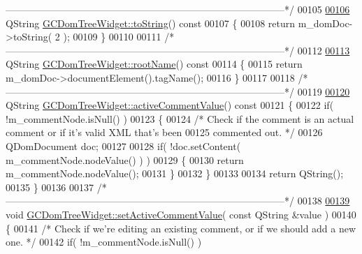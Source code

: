 \begin{DoxyCode}
{      --------------------------------------------------------------------------------------*/}
00105 
\hypertarget{gcdomtreewidget_8cpp_source_l00106}{}\hyperlink{class_g_c_dom_tree_widget_a6cd086334f363b2d0038c815e54c2b69}{00106} QString \hyperlink{class_g_c_dom_tree_widget_a6cd086334f363b2d0038c815e54c2b69}{GCDomTreeWidget::toString}()\textcolor{keyword}{ const}
00107 \textcolor{keyword}{}\{
00108   \textcolor{keywordflow}{return} m\_domDoc->toString( 2 );
00109 \}
00110 
00111 \textcolor{comment}{/*
      --------------------------------------------------------------------------------------*/}
00112 
\hypertarget{gcdomtreewidget_8cpp_source_l00113}{}\hyperlink{class_g_c_dom_tree_widget_af70ce22ef830a0a546262ff8566cd731}{00113} QString \hyperlink{class_g_c_dom_tree_widget_af70ce22ef830a0a546262ff8566cd731}{GCDomTreeWidget::rootName}()\textcolor{keyword}{ const}
00114 \textcolor{keyword}{}\{
00115   \textcolor{keywordflow}{return} m\_domDoc->documentElement().tagName();
00116 \}
00117 
00118 \textcolor{comment}{/*
      --------------------------------------------------------------------------------------*/}
00119 
\hypertarget{gcdomtreewidget_8cpp_source_l00120}{}\hyperlink{class_g_c_dom_tree_widget_aa633c35eca5e015becede2518e031042}{00120} QString \hyperlink{class_g_c_dom_tree_widget_aa633c35eca5e015becede2518e031042}{GCDomTreeWidget::activeCommentValue}()\textcolor{keyword}{ const}
00121 \textcolor{keyword}{}\{
00122   \textcolor{keywordflow}{if}( !m\_commentNode.isNull() )
00123   \{
00124     \textcolor{comment}{/* Check if the comment is an actual comment or if it's valid XML that's
       been}
00125 \textcolor{comment}{      commented out. */}
00126     QDomDocument doc;
00127 
00128     \textcolor{keywordflow}{if}( !doc.setContent( m\_commentNode.nodeValue() ) )
00129     \{
00130       \textcolor{keywordflow}{return} m\_commentNode.nodeValue();
00131     \}
00132   \}
00133 
00134   \textcolor{keywordflow}{return} QString();
00135 \}
00136 
00137 \textcolor{comment}{/*
      --------------------------------------------------------------------------------------*/}
00138 
\hypertarget{gcdomtreewidget_8cpp_source_l00139}{}\hyperlink{class_g_c_dom_tree_widget_a29bd5591054036ef5d6073a606716df3}{00139} \textcolor{keywordtype}{void} \hyperlink{class_g_c_dom_tree_widget_a29bd5591054036ef5d6073a606716df3}{GCDomTreeWidget::setActiveCommentValue}( \textcolor{keyword}{const} QString &value )
00140 \{
00141   \textcolor{comment}{/* Check if we're editing an existing comment, or if we should add a new one.
       */}
00142   \textcolor{keywordflow}{if}( !m\_commentNode.isNull() )

\end{DoxyCode}
